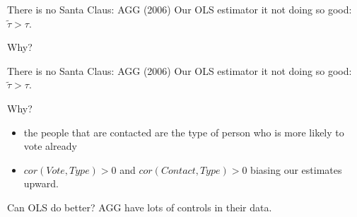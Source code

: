 \documentclass[
  ignorenonframetext,
]{beamer}
\begin{document}
\begin{frame}{There is no Santa Claus: AGG (2006)}
\protect\hypertarget{there-is-no-santa-claus-agg-2006-3}{}
Our OLS estimator it not doing so good: \(\tilde{\tau}>\tau\).

Why?
\end{frame}

\begin{frame}{There is no Santa Claus: AGG (2006)}
\protect\hypertarget{there-is-no-santa-claus-agg-2006-4}{}
Our OLS estimator it not doing so good: \(\tilde{\tau}>\tau\).

Why?

\begin{itemize}
\item
  the people that are contacted are the type of person who is more
  likely to vote already
\item
  \(cor(Vote,Type)>0\) and \(cor(Contact,Type)>0\) biasing our estimates
  upward.
\end{itemize}

Can OLS do better? AGG have lots of controls in their data.
\end{frame}
\end{document}
